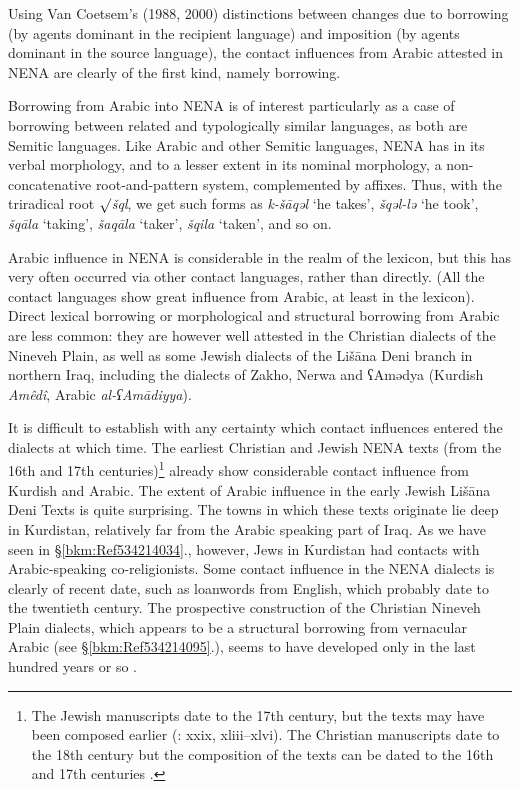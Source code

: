 \documentclass[output=paper]{langsci/langscibook}
\begin{document}
Using Van Coetsem’s (1988, 2000) distinctions between changes due to borrowing (by agents dominant in the recipient language) and imposition (by agents dominant in the source language), the contact influences from Arabic attested in NENA are clearly of the first kind, namely borrowing.

Borrowing from Arabic into NENA is of interest particularly as a case of borrowing between related and typologically similar languages, as both are Semitic languages. Like Arabic and other Semitic languages, NENA has in its verbal morphology, and to a lesser extent in its nominal morphology, a non-concatenative root-and-pattern system, complemented by affixes. Thus, with the triradical root ${\surd}$\textit{šql}, we get such forms as \textit{k-šāqəl} ‘he takes’, \textit{šqəl-lə} ‘he took’, \textit{šqāla} ‘taking’, \textit{šaqāla} ‘taker’, \textit{šqila} ‘taken’, and so on.

Arabic influence in NENA is considerable in the realm of the lexicon, but this has very often occurred via other contact languages, rather than directly. (All the contact languages show great influence from Arabic, at least in the lexicon). Direct lexical borrowing or morphological and structural borrowing from Arabic are less common: they are however well attested in the Christian dialects of the Nineveh Plain, as well as some Jewish dialects of the Lišāna Deni branch in northern Iraq, including the dialects of Zakho, Nerwa and ʕAmədya (Kurdish \textit{Amêdî}, Arabic \textit{al\nobreakdash-ʕAmādiyya}).

It is difficult to establish with any certainty which contact influences entered the dialects at which time. The earliest Christian and Jewish NENA texts (from the 16th and 17th centuries)\footnote{The Jewish manuscripts date to the 17th century, but the texts may have been composed earlier (\citealt{Sabar1976}: xxix, xliii–xlvi). The Christian manuscripts date to the 18th century but the composition of the texts can be dated to the 16th and 17th centuries \citep[16]{Mengozzi2002}.} already show considerable contact influence from Kurdish and Arabic. The extent of Arabic influence in the early Jewish Lišāna Deni Texts \citep{Sabar1984} is quite surprising. The towns in which these texts originate lie deep in Kurdistan, relatively far from the Arabic speaking part of Iraq. As we have seen in §\ref{bkm:Ref534214034}., however, Jews in Kurdistan had contacts with Arabic-speaking co{}-religionists. Some contact influence in the NENA dialects is clearly of recent date, such as loanwords from English, which probably date to the twentieth century. The prospective construction of the Christian Nineveh Plain dialects, which appears to be a structural borrowing from vernacular Arabic (see §\ref{bkm:Ref534214095}.), seems to have developed only in the last hundred years or so \citep[375]{Coghill2010b}.
\end{document}
